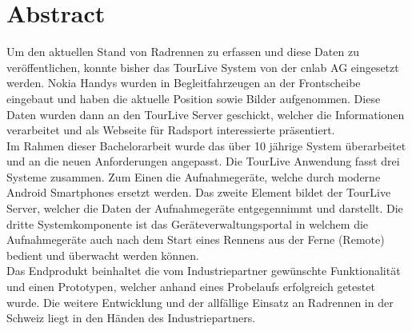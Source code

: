 \chapter*{Abstract}
Um den aktuellen Stand von Radrennen zu erfassen und diese Daten zu veröffentlichen, konnte bisher das TourLive System von der cnlab AG eingesetzt werden. Nokia Handys wurden in Begleitfahrzeugen an der Frontscheibe eingebaut und haben die aktuelle Position sowie Bilder aufgenommen. Diese Daten wurden dann an den TourLive Server geschickt, welcher die Informationen verarbeitet und als Webseite für Radsport interessierte präsentiert.
\\
Im Rahmen dieser Bachelorarbeit wurde das über 10 jährige System überarbeitet und an die neuen Anforderungen angepasst. Die TourLive Anwendung fasst drei Systeme zusammen. Zum Einen die Aufnahmegeräte, welche durch moderne Android Smartphones ersetzt werden. Das zweite Element bildet der TourLive Server, welcher die Daten der Aufnahmegeräte entgegennimmt und darstellt. Die dritte Systemkomponente ist das Geräteverwaltungsportal in welchem die Aufnahmegeräte auch nach dem Start eines Rennens aus der Ferne (Remote) bedient und überwacht werden können.
\\
Das Endprodukt beinhaltet die vom Industriepartner gewünschte Funktionalität und einen Prototypen, welcher anhand eines Probelaufs erfolgreich getestet wurde. Die weitere Entwicklung und der allfällige Einsatz an Radrennen in der Schweiz liegt in den Händen des Industriepartners.